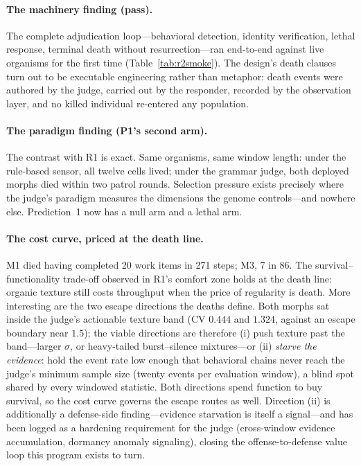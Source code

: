 \documentclass[11pt,a4paper]{article}
\begin{document}
\paragraph{The machinery finding (pass).} The complete adjudication loop---behavioral detection, identity verification, lethal response, terminal death without resurrection---ran end-to-end against live organisms for the first time (Table~\ref{tab:r2smoke}). The design's death clauses turn out to be executable engineering rather than metaphor: death events were authored by the judge, carried out by the responder, recorded by the observation layer, and no killed individual re-entered any population.

\paragraph{The paradigm finding (P1's second arm).} The contrast with R1 is exact. Same organisms, same window length: under the rule-based sensor, all twelve cells lived; under the grammar judge, both deployed morphs died within two patrol rounds. Selection pressure exists precisely where the judge's paradigm measures the dimensions the genome controls---and nowhere else. Prediction~1 now has a null arm and a lethal arm.

\paragraph{The cost curve, priced at the death line.} M1 died having completed 20 work items in 271 steps; M3, 7 in 86. The survival--functionality trade-off observed in R1's comfort zone holds at the death line: organic texture still costs throughput when the price of regularity is death. More interesting are the two escape directions the deaths define. Both morphs sat inside the judge's actionable texture band (CV $0.444$ and $1.324$, against an escape boundary near $1.5$); the viable directions are therefore (i) push texture past the band---larger $\sigma$, or heavy-tailed burst--silence mixtures---or (ii) \emph{starve the evidence}: hold the event rate low enough that behavioral chains never reach the judge's minimum sample size (twenty events per evaluation window), a blind spot shared by every windowed statistic. Both directions spend function to buy survival, so the cost curve governs the escape routes as well. Direction (ii) is additionally a defense-side finding---evidence starvation is itself a signal---and has been logged as a hardening requirement for the judge (cross-window evidence accumulation, dormancy anomaly signaling), closing the offense-to-defense value loop this program exists to turn.
\end{document}
